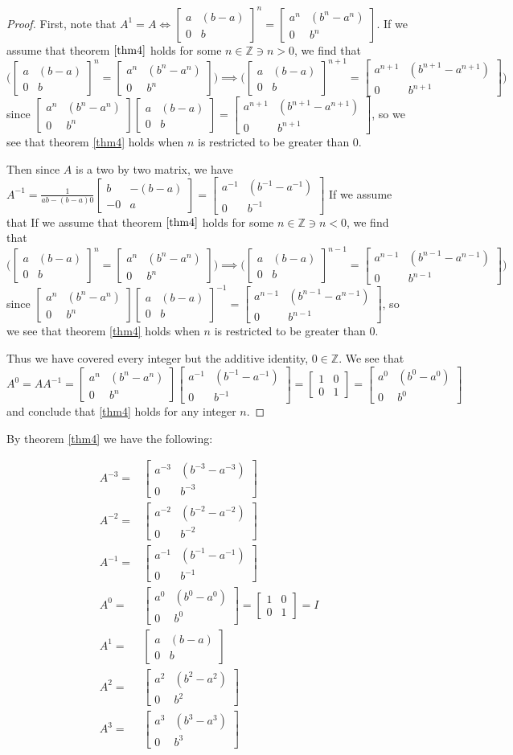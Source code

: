 \documentclass[12pt]{amsart}
\newcommand{\ints}{\mathbb{Z}}
\newcommand{\glmatrix}[4]{\ensuremath{\begin{bmatrix} #1 & #2 \\ #3 & #4 \end{bmatrix}}}
\newcommand{\glinverse}[4]{\ensuremath{\frac{1}{#1 #4 - #2 #3}\glmatrix{#4}{-#2}{-#3}{#1}}}
\begin{document}
\begin{proof}
	First, note that $A^1 = A \iff \glmatrix{a}{(b-a)}{0}{b}^n = \glmatrix{a^n}{(b^n-a^n)}{0}{b^n}$.
	If we assume that theorem $\ref{thm4}$ holds for some $n \in \ints \ni n > 0$,
	we find that $\Big(\glmatrix{a}{(b-a)}{0}{b}^n = \glmatrix{a^n}{(b^n-a^n)}{0}{b^n}\Big)
	\implies \Big(\glmatrix{a}{(b-a)}{0}{b}^{n+1} = \glmatrix{a^{n+1}}{(b^{n+1}-a^{n+1})}{0}{b^{n+1}}\Big)$
	since $\glmatrix{a^n}{(b^n-a^n)}{0}{b^n}\glmatrix{a}{(b-a)}{0}{b} =
	\glmatrix{a^{n+1}}{(b^{n+1}-a^{n+1})}{0}{b^{n+1}}$,
	so we see that theorem \ref{thm4} holds when $n$ is restricted
	to be greater than $0$.

	Then since $A$ is a two by two matrix,
	we have $A^{-1} = \glinverse{a}{(b-a)}{0}{b} = \glmatrix{a^{-1}}{(b^{-1}-a^{-1})}{0}{b^{-1}}$
	If we assume that 
	If we assume that theorem $\ref{thm4}$ holds for some $n \in \ints \ni n < 0$,
	we find that $\Big(\glmatrix{a}{(b-a)}{0}{b}^n = \glmatrix{a^n}{(b^n-a^n)}{0}{b^n}\Big)
	\implies \Big(\glmatrix{a}{(b-a)}{0}{b}^{n-1} = \glmatrix{a^{n-1}}{(b^{n-1}-a^{n-1})}{0}{b^{n-1}}\Big)$
	since $\glmatrix{a^n}{(b^n-a^n)}{0}{b^n}\glmatrix{a}{(b-a)}{0}{b}^{-1} =
	\glmatrix{a^{n-1}}{(b^{n-1}-a^{n-1})}{0}{b^{n-1}}$,
	so we see that theorem \ref{thm4} holds when $n$ is restricted
	to be greater than $0$.

	Thus we have covered every integer but the additive identity, $0 \in \ints$.
	We see that $A^0 = AA^{-1} = 
	\glmatrix{a^n}{(b^n-a^n)}{0}{b^n} \glmatrix{a^{-1}}{(b^{-1}-a^{-1})}{0}{b^{-1}}
	= \glmatrix{1}{0}{0}{1}
	= \glmatrix{a^0}{(b^0-a^0)}{0}{b^0}$
	and conclude that \ref{thm4} holds for any integer $n$.
\end{proof}

By theorem \ref{thm4} we have the following:

\begin{align}
	A^{-3} = & \glmatrix{a^{-3}}{(b^{-3}-a^{-3})}{0}{b^{-3}}\\
	A^{-2} = & \glmatrix{a^{-2}}{(b^{-2}-a^{-2})}{0}{b^{-2}} \\
	A^{-1} = & \glmatrix{a^{-1}}{(b^{-1}-a^{-1})}{0}{b^{-1}}\\
	A^0 = & \glmatrix{a^0}{(b^0-a^0)}{0}{b^0} = \glmatrix{1}{0}{0}{1} = I \\
	A^1 = & \glmatrix{a}{(b-a)}{0}{b} \\
	A^2 = & \glmatrix{a^2}{(b^2-a^2)}{0}{b^2}\\
	A^3 = & \glmatrix{a^3}{(b^3-a^3)}{0}{b^3}
\end{align}
\end{document}

